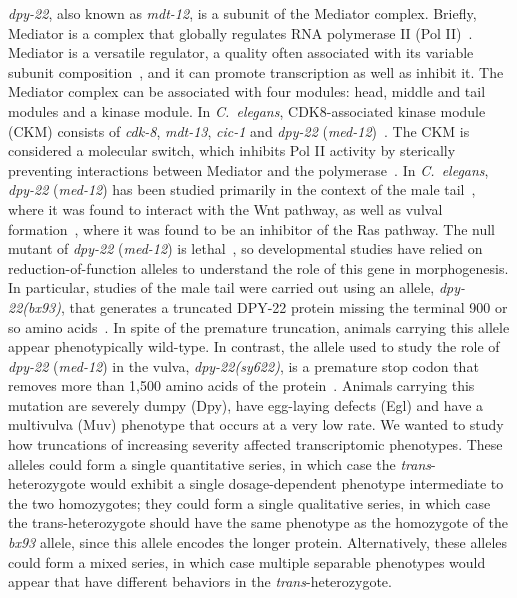 \documentclass[10pt, onecolumn]{article}
\newcommand{\cel}{\emph{C.~elegans}}
\newcommand{\gene}[1]{\mbox{\emph{#1}}}
\newcommand{\protein}[1]{\mbox{\uppercase{#1}}}
\newcommand{\dpy}{\gene{dpy-22} (\emph{med-12})}
\begin{document}
\gene{dpy-22}, also known as \gene{mdt-12}, is a subunit of the Mediator
complex. Briefly, Mediator is a complex that globally regulates RNA polymerase
II (Pol II)~\cite{Allen2015,Takagi2006}. Mediator is a versatile regulator, a
quality often associated with its variable subunit composition~\cite{Allen2015},
and it can promote transcription as well as inhibit it. The Mediator complex can
be associated with four modules: head, middle and tail modules and a kinase
module. In \cel{}, CDK8-associated kinase module (CKM) consists of \gene{cdk-8},
\gene{mdt-13}, \gene{cic-1} and \dpy{}~\cite{Grants2015}. The CKM is considered
a molecular switch, which inhibits Pol II activity by sterically preventing
interactions between Mediator and the polymerase~\cite{Knuesel2009,Elmlund2006}.
In \cel{}, \dpy{} has been studied primarily in the context of the male
tail~\cite{Zhang2000}, where it was found to interact with the Wnt pathway, as
well as vulval formation~\cite{Moghal2003a}, where it was found to be an
inhibitor of the Ras pathway. The null mutant of \dpy{} is
lethal~\cite{}, so developmental studies have relied
on reduction-of-function alleles to understand the role of this gene in
morphogenesis. In particular, studies of the male tail were carried out using
an allele, \gene{dpy-22(bx93)}, that generates a truncated \protein{dpy-22}
protein missing the terminal 900 or so amino acids~\cite{Zhang2000}. In spite of
the premature truncation, animals carrying this allele appear phenotypically
wild-type. In contrast, the allele used to study the role of \dpy{} in the vulva,
\gene{dpy-22(sy622)}, is a premature stop codon that removes more than 1,500
amino acids of the protein~\cite{Moghal2003}. Animals carrying this mutation are
severely dumpy (Dpy), have egg-laying defects (Egl) and have a multivulva (Muv)
phenotype that occurs at a very low rate. We wanted to study how truncations of
increasing severity affected transcriptomic phenotypes. These alleles could form
a single quantitative series, in which case the \emph{trans}-heterozygote would
exhibit a single dosage-dependent phenotype intermediate to the two homozygotes;
they could form a single qualitative series, in which case the trans-heterozygote
should have the same phenotype as the homozygote of the \emph{bx93} allele, since
this allele encodes the longer protein. Alternatively, these alleles could form a
mixed series, in which case multiple separable phenotypes would appear that
have different behaviors in the \emph{trans}-heterozygote.
\end{document}
